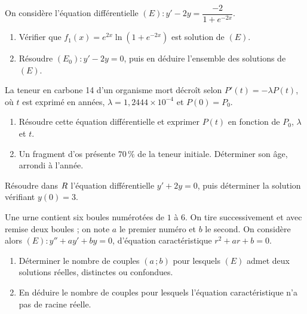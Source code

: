 \begin{annales}
On considère l'équation différentielle
$(E) : y'-2y = \dfrac{-2}{1+e^{-2x}}$.
\begin{enumerate}[label=\textbf{\alph*)}, leftmargin=*, itemsep=0.15em]
  \item Vérifier que $f_{1}(x) = e^{2x}\ln\!\left(1+e^{-2x}\right)$ est
        solution de $(E)$.
  \item Résoudre $(E_{0}) : y'-2y = 0$, puis en déduire l'ensemble des
        solutions de $(E)$.
\end{enumerate}

La teneur en carbone 14 d'un organisme mort décroît selon
$P'(t) = -\lambda P(t)$, où $t$ est exprimé en années,
$\lambda = 1{,}2444\times10^{-4}$ et $P(0) = P_{0}$.
\begin{enumerate}[label=\textbf{\alph*)}, leftmargin=*, itemsep=0.15em]
  \item Résoudre cette équation différentielle et exprimer $P(t)$ en fonction
        de $P_{0}$, $\lambda$ et $t$.
  \item Un fragment d'os présente $70\,\%$ de la teneur initiale. Déterminer
        son âge, arrondi à l'année.
\end{enumerate}

Résoudre dans $R$ l'équation différentielle $y'+2y = 0$, puis déterminer la
solution vérifiant $y(0) = 3$.

Une urne contient six boules numérotées de $1$ à $6$. On tire successivement
et avec remise deux boules ; on note $a$ le premier numéro et $b$ le second.
On considère alors $(E) : y''+ay'+by = 0$, d'équation caractéristique
$r^{2}+ar+b = 0$.
\begin{enumerate}[label=\textbf{\alph*)}, leftmargin=*, itemsep=0.15em]
  \item Déterminer le nombre de couples $(a\,;b)$ pour lesquels $(E)$ admet
        deux solutions réelles, distinctes ou confondues.
  \item En déduire le nombre de couples pour lesquels l'équation
        caractéristique n'a pas de racine réelle.
\end{enumerate}
\end{annales}

